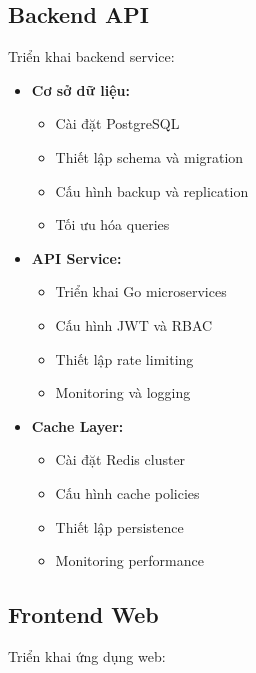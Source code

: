 \subsection{Backend API}
\hspace{0.5cm}Triển khai backend service:

\begin{itemize}
    \item \textbf{Cơ sở dữ liệu:}
    \begin{itemize}
        \item Cài đặt PostgreSQL
        \item Thiết lập schema và migration
        \item Cấu hình backup và replication
        \item Tối ưu hóa queries
    \end{itemize}
    
    \item \textbf{API Service:}
    \begin{itemize}
        \item Triển khai Go microservices
        \item Cấu hình JWT và RBAC
        \item Thiết lập rate limiting
        \item Monitoring và logging
    \end{itemize}
    
    \item \textbf{Cache Layer:}
    \begin{itemize}
        \item Cài đặt Redis cluster
        \item Cấu hình cache policies
        \item Thiết lập persistence
        \item Monitoring performance
    \end{itemize}
\end{itemize}

\subsection{Frontend Web}
\hspace{0.5cm}Triển khai ứng dụng web:

